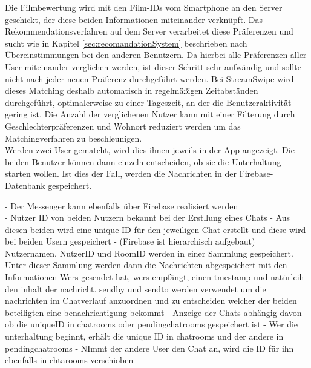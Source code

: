 Die Filmbewertung wird mit den Film-IDs vom Smartphone an den Server geschickt, der diese beiden Informationen miteinander verknüpft. Das Rekommendationsverfahren auf dem Server verarbeitet diese Präferenzen und sucht wie in Kapitel \ref{sec:recomandationSystem} beschrieben nach Übereinstimmungen bei den anderen Benutzern. Da hierbei alle Präferenzen aller User miteinander verglichen werden, ist dieser Schritt sehr aufwändig und sollte nicht nach jeder neuen Präferenz durchgeführt werden. Bei StreamSwipe wird dieses Matching deshalb automatisch in regelmäßigen Zeitabständen durchgeführt, optimalerweise zu einer Tageszeit, an der die Benutzeraktivität gering ist. Die Anzahl der verglichenen Nutzer kann mit einer Filterung durch Geschlechterpräferenzen und Wohnort reduziert werden um das Matchingverfahren zu beschleunigen. \\
Werden zwei User gematcht, wird dies ihnen jeweils in der App angezeigt. Die beiden Benutzer können dann einzeln entscheiden, ob sie die Unterhaltung starten wollen. Ist dies der Fall, werden die Nachrichten in der Firebase-Datenbank gespeichert. %



- Der Messenger kann ebenfalls über Firebase realisiert werden\\ %

- Nutzer ID von beiden Nutzern bekannt bei der  Erstllung eines Chats
- Aus diesen beiden wird eine unique ID für den jeweiligen Chat erstellt und diese wird bei beiden Usern gespeichert
- (Firebase ist hierarchisch aufgebaut) Nutzernamen, NutzerID und RoomID werden in einer Sammlung gespeichert. Unter dieser Sammlung werden dann die Nachrichten abgespeichert mit den Informationen Wers gesendet hat, wers empfängt, einen tmestamp und natürlcih den inhalt der nachricht. sendby und sendto werden verwendet um die nachrichten im Chatverlauf anzuordnen und zu entscheiden welcher der beiden beteiligten eine benachrichtigung bekommt
- Anzeige der Chats abhängig davon ob die uniqueID in chatrooms oder pendingchatrooms gespeichert ist
- Wer die unterhaltung beginnt, erhält die unique ID in chatrooms und der andere in pendingchatrooms
- NImmt der andere User den Chat an, wird die ID für ihn ebenfalls in chtarooms verschioben
-


%
%
%
%
